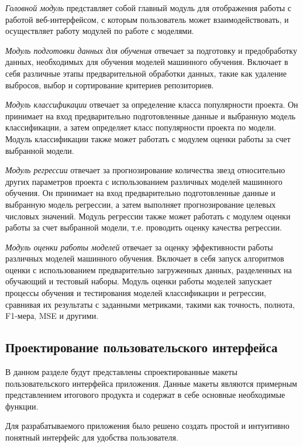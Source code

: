 \textit{Головной модуль} представляет собой главный модуль для отображения работы с работой веб-интерфейсом, с которым пользователь может взаимодействовать, и осуществляет работу модулей по работе с моделями.

\textit{Модуль подготовки данных для обучения} отвечает за подготовку и предобработку данных, необходимых для обучения моделей машинного обучения. Включает в себя различные этапы предварительной обработки данных, такие как удаление выбросов, выбор и сортирование критериев репозиториев.

\textit{Модуль классификации} отвечает за определение класса популярности проекта. Он принимает на вход предварительно подготовленные данные и выбранную модель классификации, а затем определяет класс популярности проекта по модели. Модуль классификации также может работать с модулем оценки работы за счет выбранной модели.

\textit{Модуль регрессии} отвечает за прогнозирование количества звезд относительно других параметров проекта с использованием различных моделей машинного обучения. Он принимает на вход предварительно подготовленные данные и выбранную модель регрессии, а затем выполняет прогнозирование целевых числовых значений. Модуль регрессии также может работать с модулем оценки работы за счет выбранной модели, т.е. проводить оценку качества регрессии.

\textit{Модуль оценки работы моделей} отвечает за оценку эффективности работы различных моделей машинного обучения. Включает в себя запуск алгоритмов оценки с использованием предварительно загруженных данных, разделенных на обучающий и тестовый наборы. Модуль оценки работы моделей запускает процессы обучения и тестирования моделей классификации и регрессии, сравнивая их результаты с заданными метриками, такими как точность, полнота, F1-мера, MSE и другими. 
\vspace{1em}

\subsection{Проектирование пользовательского интерфейса}
\label{sec:Graphical-interface}

В данном разделе будут представлены спроектированные макеты пользовательского интерфейса приложения. Данные макеты являются примерным представлением итогового продукта и содержат в себе основные необходимые функции.

Для разрабатываемого приложения было решено создать простой и интуитивно понятный интерфейс для удобства пользователя.

